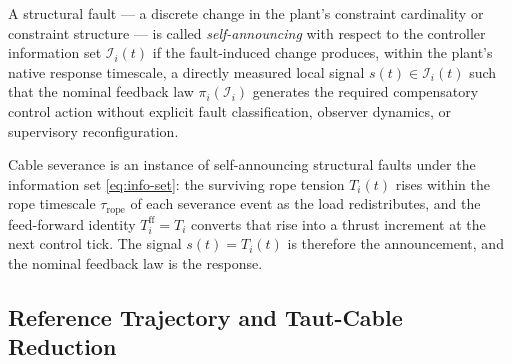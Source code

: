 \begin{definition}
\label{def:self-announcing}
A structural fault --- a discrete change in the plant's constraint cardinality or constraint structure --- is called \emph{self-announcing} with respect to the controller information set $\mathcal{I}_i(t)$ if the fault-induced change produces, within the plant's native response timescale, a directly measured local signal $s(t) \in \mathcal{I}_i(t)$ such that the nominal feedback law $\pi_i(\mathcal{I}_i)$ generates the required compensatory control action without explicit fault classification, observer dynamics, or supervisory reconfiguration.
\end{definition}

Cable severance is an instance of self-announcing structural faults under the information set \eqref{eq:info-set}: the surviving rope tension $T_i(t)$ rises within the rope timescale $\tau_{\mathrm{rope}}$ of each severance event as the load redistributes, and the feed-forward identity $T_i^{\mathrm{ff}} = T_i$ converts that rise into a thrust increment at the next control tick. The signal $s(t) = T_i(t)$ is therefore the announcement, and the nominal feedback law is the response.

\subsection{Reference Trajectory and Taut-Cable Reduction}
\label{sec:reduction-and-reference}


